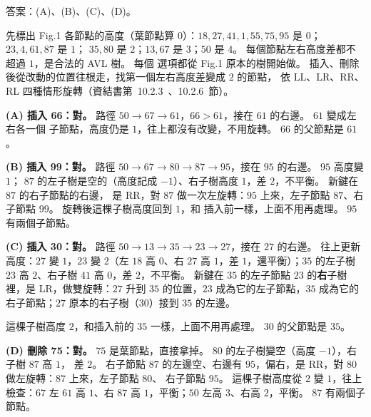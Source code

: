 \begin{pastsoln}
答案：(A)、(B)、(C)、(D)。

先標出 Fig.1 各節點的高度（葉節點算 $0$）：$18, 27, 41, 1, 55, 75, 95$ 是 $0$；$23, 4, 61, 87$ 是 $1$；
$35, 80$ 是 $2$；$13, 67$ 是 $3$；$50$ 是 $4$。 每個節點左右高度差都不超過 $1$，是合法的 AVL 樹。 每個
選項都從 Fig.1 原本的樹開始做。 插入、刪除後從改動的位置往根走，找第一個左右高度差變成 $2$ 的節點，
依 LL、LR、RR、RL 四種情形旋轉（資結書第~10.2.3~、10.2.6~節）。

\textbf{(A) 插入 66：對。} 路徑 $50 \to 67 \to 61$，$66 > 61$，接在 $61$ 的右邊。 $61$ 變成左右各一個
子節點，高度仍是 $1$，往上都沒有改變，不用旋轉。 $66$ 的父節點是 $61$。

\textbf{(B) 插入 99：對。} 路徑 $50 \to 67 \to 80 \to 87 \to 95$，接在 $95$ 的右邊。 $95$ 高度變 $1$；
$87$ 的左子樹是空的（高度記成 $-1$）、右子樹高度 $1$，差 $2$，不平衡。 新鍵在 $87$ 的右子節點的右邊，
是 RR，對 $87$ 做一次左旋轉：$95$ 上來，左子節點 $87$、右子節點 $99$。 旋轉後這棵子樹高度回到 $1$，和
插入前一樣，上面不用再處理。 $95$ 有兩個子節點。

\textbf{(C) 插入 30：對。} 路徑 $50 \to 13 \to 35 \to 23 \to 27$，接在 $27$ 的右邊。 往上更新高度：$27$
變 $1$，$23$ 變 $2$（左 $18$ 高 $0$、右 $27$ 高 $1$，差 $1$，還平衡）；$35$ 的左子樹 $23$ 高 $2$、右子樹
$41$ 高 $0$，差 $2$，不平衡。 新鍵在 $35$ 的左子節點 $23$ 的\textbf{右}子樹裡，是 LR，做雙旋轉：$27$
升到 $35$ 的位置，$23$ 成為它的左子節點，$35$ 成為它的右子節點；$27$ 原本的右子樹（$30$）接到 $35$
的左邊。
\begin{center}
\end{center}
這棵子樹高度 $2$，和插入前的 $35$ 一樣，上面不用再處理。 $30$ 的父節點是 $35$。

\textbf{(D) 刪除 75：對。} $75$ 是葉節點，直接拿掉。 $80$ 的左子樹變空（高度 $-1$），右子樹 $87$ 高 $1$，
差 $2$。 右子節點 $87$ 的左邊空、右邊有 $95$，偏右，是 RR，對 $80$ 做左旋轉：$87$ 上來，左子節點 $80$、
右子節點 $95$。 這棵子樹高度從 $2$ 變 $1$，往上檢查：$67$ 左 $61$ 高 $1$、右 $87$ 高 $1$，平衡；$50$
左高 $3$、右高 $2$，平衡。 $87$ 有兩個子節點。


\end{pastsoln}
